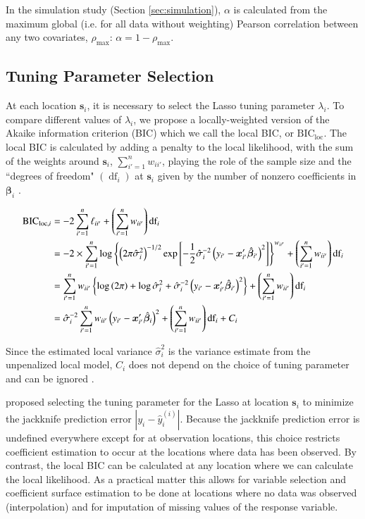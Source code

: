 \documentclass[authoryear, review, 11pt]{elsarticle}
\DeclareMathOperator*{\df}{\mbox{df}}
\begin{document}
	In the simulation study (Section \ref{sec:simulation}), $\alpha$ is calculated from the maximum global (i.e. for all data without weighting) Pearson correlation between any two covariates, $\rho_{\text{max}}$: $\alpha = 1-\rho_{\text{max}}$.

	\subsection{Tuning Parameter Selection}	
	At each location $\bm{s}_i$, it is necessary to select the Lasso tuning parameter $\lambda_i$. To compare different values of $\lambda_i$, we propose a locally-weighted version of the Akaike information criterion (BIC) \citep{Akaike:1974} which we call the local BIC, or $\mbox{BIC}_{\text{loc}}$. The local BIC is calculated by adding a penalty to the local likelihood, with the sum of the weights around $\bm{s}_i$, $\sum_{i'=1}^n w_{ii'}$, playing the role of the sample size and the ``degrees of freedom" $\left( \df_i \right)$ at $\bm{s}_i$ given by the number of nonzero coefficients in $\bm{\beta}_i$ \citep{Zou:2007}.
	
	\begin{align}
		\mbox{BIC}_{\text{loc}, i} &= -2 \sum_{i'=1}^n \ell_{ii'}  + \left( \sum_{i'=1}^n w_{ii'} \right) \mbox{df}_i\notag\\
		&= -2 \times \sum_{i'=1}^n \log \left\{ \left(2 \pi \hat{\sigma}_i^2\right)^{-1/2} \exp \left[-\frac{1}{2} \hat{\sigma}_i^{-2} \left(y_{i'} - \bm{x}_{i'}' \hat{\bm{\beta}}_{i'} \right)^2\right] \right\}^{w_{ii'}} + \left( \sum_{i'=1}^n w_{ii'} \right) \mbox{df}_i\notag\\
		&= \sum_{i'=1}^n w_{ii'} \left\{ \log \left(2 \pi \right) + \log \hat{\sigma}_i^2 + \hat{\sigma}_i^{-2} \left(y_{i'} - \bm{x}_{i'}' \hat{\bm{\beta}}_{i'} \right)^2 \right\} + \left( \sum_{i'=1}^n w_{ii'} \right) \mbox{df}_i \notag\\
		&= \hat{\sigma}_i^{-2} \sum_{i'=1}^n w_{ii'} \left( y_{i'} - \bm{x}'_{i'} \hat{\bm{\beta}}_i \right)^2 + \left( \sum_{i'=1}^n w_{ii'} \right) \mbox{df}_i + C_i
	\end{align}	
	
	Since the estimated local variance $\hat{\sigma}_i^2$ is the variance estimate from the unpenalized local model, $C_i$ does not depend on the choice of tuning parameter and can be ignored \citep{Zou:2007}.
	
	\cite{Wheeler:2009} proposed selecting the tuning parameter for the Lasso at location $\bm{s}_i$ to minimize the jackknife prediction error $|y_i - \hat{y}_i^{(i)}|$. Because the jackknife prediction error is undefined everywhere except for at observation locations, this choice restricts coefficient estimation to occur at the locations where data has been observed. By contrast, the local BIC can be calculated at any location where we can calculate the local likelihood. As a practical matter this allows for variable selection and coefficient surface estimation to be done at locations where no data was observed (interpolation) and for imputation of missing values of the response variable.
	 
\end{document}
